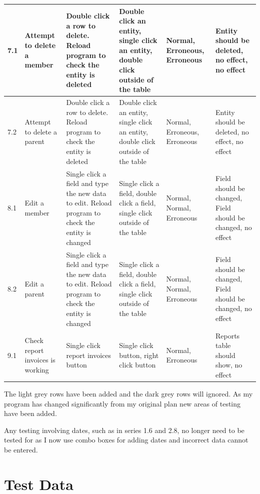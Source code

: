 \begin{landscape}
\begin{center}
\begin{longtable}{|p{1.5cm}|p{2.5cm}|p{2.5cm}|p{2cm}|p{2cm}|p{2cm}|}
        \rowcolor{lightgrey} 7.1 & Attempt to delete a member & Double click a row to delete. Reload program to check the entity is deleted & Double click an entity, single click an entity, double click outside of the table & Normal, Erroneous, Erroneous  & Entity should be deleted, no effect, no effect \\ \hline
        \rowcolor{lightgrey} 7.2 & Attempt to delete a parent & Double click a row to delete. Reload program to check the entity is deleted & Double click an entity, single click an entity, double click outside of the table & Normal, Erroneous, Erroneous  & Entity should be deleted, no effect, no effect \\ \hline
        
       \rowcolor{lightgrey} 8.1 & Edit a member & Single click a field and type the new data to edit. Reload program to check the entity is changed & Single click a field, double click a field, single click outside of the table & Normal, Normal, Erroneous  & Field should be changed, Field should be changed, no effect \\ \hline
       \rowcolor{lightgrey} 8.2 & Edit a parent & Single click a field and type the new data to edit. Reload program to check the entity is changed & Single click a field, double click a field, single click outside of the table & Normal, Normal, Erroneous  & Field should be changed, Field should be changed, no effect\\ \hline

       \rowcolor{lightgrey} 9.1 & Check report invoices is working & Single click report invoices button & Single click button, right click button & Normal, Erroneous  & Reports table should show, no effect \\ \hline

    \end{longtable}
\end{center}

The light grey rows have been added and the dark grey rows will ignored. As my program has changed significantly from my original plan new areas of testing have been added.

Any testing involving dates, such as in series 1.6 and 2.8, no longer need to be tested for as I now use combo boxes for adding dates and incorrect data cannot be entered.

\section{Test Data}


\end{landscape}
